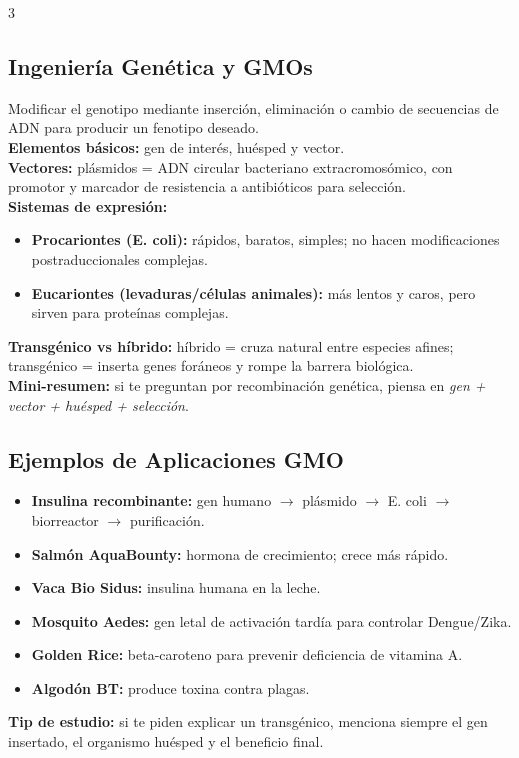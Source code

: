 \documentclass[9pt,landscape,letterpaper]{extarticle}
\begin{document}
\begin{multicols*}{3}
	\subsection{Ingeniería Genética y GMOs}
	Modificar el genotipo mediante inserción, eliminación o cambio de secuencias de ADN para producir un fenotipo deseado.\\
	\textbf{Elementos básicos:} gen de interés, huésped y vector.\\
	\textbf{Vectores:} plásmidos = ADN circular bacteriano extracromosómico, con promotor y marcador de resistencia a antibióticos para selección.\\
	\textbf{Sistemas de expresión:}
	\begin{itemize}
		\item \textbf{Procariontes (E. coli):} rápidos, baratos, simples; no hacen modificaciones postraduccionales complejas.
		\item \textbf{Eucariontes (levaduras/células animales):} más lentos y caros, pero sirven para proteínas complejas.
	\end{itemize}
	\textbf{Transgénico vs híbrido:} híbrido = cruza natural entre especies afines; transgénico = inserta genes foráneos y rompe la barrera biológica.\\
	\textbf{Mini-resumen:} si te preguntan por recombinación genética, piensa en \textit{gen + vector + huésped + selección}.

	\subsection{Ejemplos de Aplicaciones GMO}
	\begin{itemize}
		\item \textbf{Insulina recombinante:} gen humano $\rightarrow$ plásmido $\rightarrow$ E. coli $\rightarrow$ biorreactor $\rightarrow$ purificación.
		\item \textbf{Salmón AquaBounty:} hormona de crecimiento; crece más rápido.
		\item \textbf{Vaca Bio Sidus:} insulina humana en la leche.
		\item \textbf{Mosquito Aedes:} gen letal de activación tardía para controlar Dengue/Zika.
		\item \textbf{Golden Rice:} beta-caroteno para prevenir deficiencia de vitamina A.
		\item \textbf{Algodón BT:} produce toxina contra plagas.
	\end{itemize}
	\textbf{Tip de estudio:} si te piden explicar un transgénico, menciona siempre el gen insertado, el organismo huésped y el beneficio final.


\end{multicols*}
\end{document}

